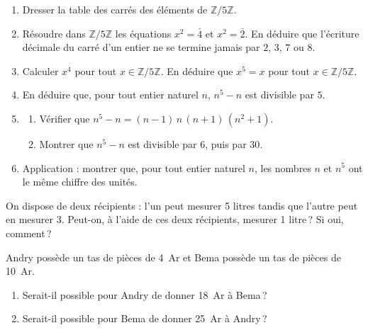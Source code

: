 \begin{exo}\label{exo:arith-26}
      \begin{enumerate}
            \item Dresser la table des carr\'es des \'el\'ements de $\mathbb{Z}/5\mathbb{Z}$.
            \item R\'esoudre dans $\mathbb{Z}/5\mathbb{Z}$ les \'equations $x^2 = \bar{4}$ et $x^2 = \bar{2}$.
                  En d\'eduire que l'\'ecriture d\'ecimale du carr\'e d'un entier ne se termine jamais par $2$, $3$, $7$ ou $8$.
            \item Calculer $x^4$ pour tout $x \in \mathbb{Z}/5\mathbb{Z}$.
                  En d\'eduire que $x^5 = x$ pour tout $x \in \mathbb{Z}/5\mathbb{Z}$.
            \item En d\'eduire que, pour tout entier naturel $n$, $n^5 - n$ est divisible par $5$.
            \item \begin{enumerate}
                        \item V\'erifier que $n^5 - n = (n-1)\, n\, (n+1)\, (n^2 + 1)$.
                        \item Montrer que $n^5 - n$ est divisible par $6$, puis par $30$.
                  \end{enumerate}
            \item Application : montrer que, pour tout entier naturel $n$, les nombres $n$ et $n^5$ ont le m\^eme chiffre des unit\'es.
      \end{enumerate}
\end{exo}
\begin{exo}\label{exo:arith-27}
	On dispose de deux r\'ecipients : l'un peut mesurer 5 litres tandis que l'autre peut en mesurer 3.
	Peut-on, \`a l'aide de ces deux r\'ecipients, mesurer 1 litre\,? Si oui, comment\,?
\end{exo}
%
\begin{exo}\label{exo:arith-28}
	Andry poss\`ede un tas de pi\`eces de 4~Ar et Bema poss\`ede un tas de pi\`eces de 10~Ar.
	\begin{enumerate}
		\item Serait-il possible pour Andry de donner 18~Ar \`a Bema\,?
		\item Serait-il possible pour Bema de donner 25~Ar \`a Andry\,?
	\end{enumerate}
\end{exo}
